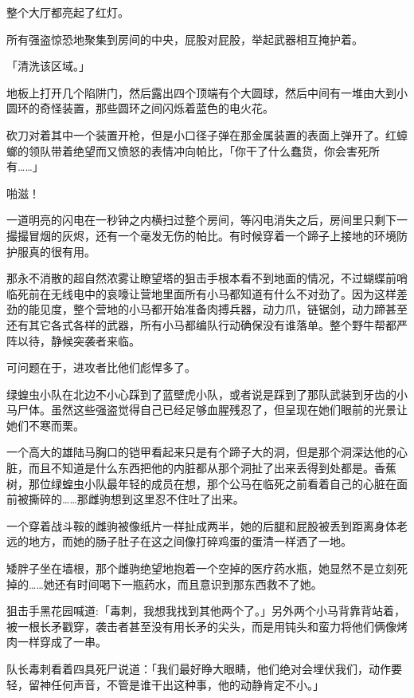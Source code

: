 整个大厅都亮起了红灯。

所有强盗惊恐地聚集到房间的中央，屁股对屁股，举起武器相互掩护着。

「{\mt 清洗该区域。}」

地板上打开几个陷阱门，然后露出四个顶端有个大圆球，然后中间有一堆由大到小圆环的奇怪装置，那些圆环之间闪烁着蓝色的电火花。

砍刀对着其中一个装置开枪，但是小口径子弹在那金属装置的表面上弹开了。红蟑螂的领队带着绝望而又愤怒的表情冲向帕比，「你干了什么蠢货，你会害死所有……」

啪滋！

一道明亮的闪电在一秒钟之内横扫过整个房间，等闪电消失之后，房间里只剩下一撮撮冒烟的灰烬，还有一个毫发无伤的帕比。有时候穿着一个蹄子上接地的环境防护服真的很有用。

\horizonline


那永不消散的超自然浓雾让瞭望塔的狙击手根本看不到地面的情况，不过蝴蝶前哨临死前在无线电中的哀嚎让营地里面所有小马都知道有什么不对劲了。因为这样差劲的能见度，整个营地的小马都开始准备肉搏兵器，动力爪，链锯剑，动力蹄甚至还有其它各式各样的武器，所有小马都编队行动确保没有谁落单。整个野牛帮都严阵以待，静候突袭者来临。

可问题在于，进攻者比他们彪悍多了。

绿蝗虫小队在北边不小心踩到了蓝壁虎小队，或者说是踩到了那队武装到牙齿的小马尸体。虽然这些强盗觉得自己已经足够血腥残忍了，但呈现在她们眼前的光景让她们不寒而栗。

一个高大的雄陆马胸口的铠甲看起来只是有个蹄子大的洞，但是那个洞深达他的心脏，而且不知道是什么东西把他的内脏都从那个洞扯了出来丢得到处都是。香蕉树，那位绿蝗虫小队最年轻的成员在想，那个公马在临死之前看着自己的心脏在面前被撕碎的……那雌驹想到这里忍不住吐了出来。

一个穿着战斗鞍的雌驹被像纸片一样扯成两半，她的后腿和屁股被丢到距离身体老远的地方，而她的肠子肚子在这之间像打碎鸡蛋的蛋清一样洒了一地。

矮胖子坐在墙根，那个雌驹绝望地抱着一个空掉的医疗药水瓶，她显然不是立刻死掉的……她还有时间喝下一瓶药水，而且意识到那东西救不了她。

狙击手黑花园喊道:「毒刺，我想我找到其他两个了。」另外两个小马背靠背站着，被一根长矛戳穿，袭击者甚至没有用长矛的尖头，而是用钝头和蛮力将他们俩像烤肉一样穿成了一串。

队长毒刺看着四具死尸说道：「我们最好睁大眼睛，他们绝对会埋伏我们，动作要轻，留神任何声音，不管是谁干出这种事，他的动静肯定不小。」

